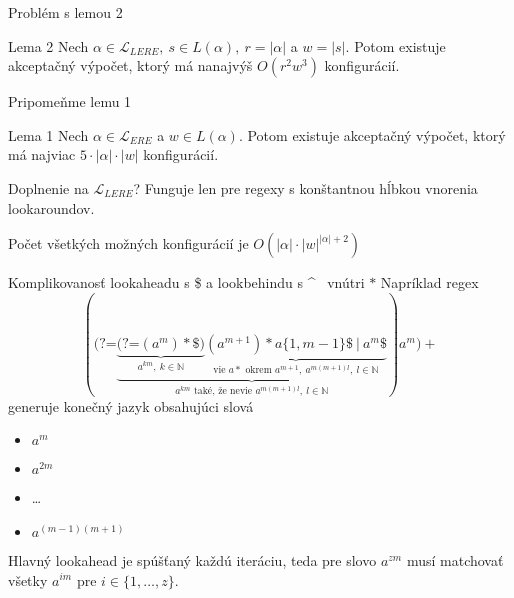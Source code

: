 \documentclass[mathserif]{beamer}
\def\N{\mathds{N}} %
\def\el{\mathscr{L}_{ERE}}
\def\lel{\mathscr{L}_{LERE}}
\def\lookahead{\text{(?=}}
\begin{document}
\begin{frame}{Problém s lemou 2}
\begin{block}{Lema 2}
Nech $\alpha \in \lel,~ s \in L(\alpha),~ r = |\alpha|$ a $w = |s|$. Potom existuje akceptačný výpočet, ktorý má nanajvýš $O(r^2w^3)$ konfigurácií.
\end{block}

\vspace{10pt}
Pripomeňme lemu 1
\begin{block}{Lema 1}
Nech $\alpha \in \el$ a $w \in L(\alpha)$. Potom existuje akceptačný výpočet, ktorý má najviac $5\cdot|\alpha|\cdot|w|$ konfigurácií.
\end{block}
Doplnenie na $\lel$? Funguje len pre regexy s konštantnou hĺbkou vnorenia lookaroundov.

\vspace{5pt}
Počet všetkých možných konfigurácií je $O(|\alpha|\cdot|w|^{|\alpha|+2})$
\end{frame}

\begin{frame}{Komplikovanosť lookaheadu s \$ a lookbehindu s \textasciicircum ~ vnútri $*$}
Napríklad regex
$$(\lookahead \underbrace{
 \underbrace{ \lookahead (a^m)*\$ )}_{a^{km},~ k\in\N} 
 \underbrace{(a^{m+1})* a\lbrace 1,m-1\rbrace \$ ~|~ a^m \$ }_{\text{vie } a* \text{ okrem } a^{m+1},~a^{m(m+1)l},~ l\in\N} 
 }_{a^{km} \text{ také, že nevie } a^{m(m+1)l}, ~l\in\N }
  ) a^m)+$$
generuje konečný jazyk obsahujúci slová 
\begin{itemize}
\item $a^m$
\item $a^{2m}$
\item \dots
\item $a^{(m-1)(m+1)}$
\end{itemize} 
Hlavný lookahead je spúšťaný každú iteráciu, teda pre slovo $a^{zm}$ musí matchovať všetky $a^{im}$ pre $i\in\lbrace 1,\dots,z\rbrace$.
\end{frame}
\end{document}
